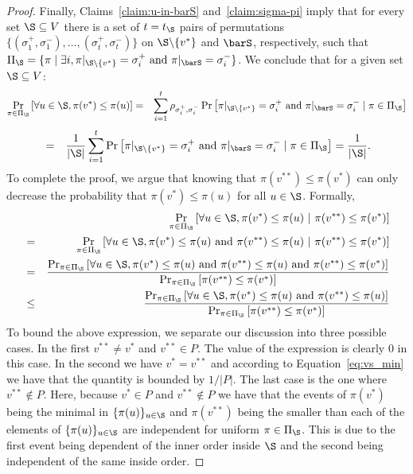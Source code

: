 \begin{proof}
Finally, Claims~\ref{claim:u-in-barS} and~\ref{claim:sigma-pi} imply that for every set $\S\subseteq V$ there is a set of $t=t_{\S}$ pairs of permutations $\{(\sigma_{1}^{+}, \sigma_{1}^{-}),\dots,(\sigma_{t}^{+}, \sigma_{t}^{-}) \}$ on $\S\backslash\{v^*\}$ and $\barS$, respectively, such that $\Pi_{\S}=\{\pi\mid \exists i, \pi|_{\S\backslash\{v^*\}}=\sigma_{i}^{+}\mbox{ and }\pi|_{\barS}=\sigma_{i}^{-}\}$. We conclude that for a given set $\S\subseteq V$:
\vspace{-0.2in}
\begin{eqnarray*}
\Pr_{\pi\in\Pi_{\S}}\left[\forall u\in\S, \pi(v^*)\leq\pi(u)\right] & = & \sum_{i=1}^{t}\rho_{\sigma_{i}^{+},\sigma_{i}^{-}}\Pr\left[\pi|_{\S\backslash\{v^*\}}=\sigma_{i}^{+}\mbox{ and }\pi|_{\barS}=\sigma_{i}^{-}\mid\pi\in\Pi_{\S}\right]
\end{eqnarray*}
\vspace{-0.25in}
\begin{eqnarray} \label{eq:vs_min}
& = & \frac{1}{|\S|}\sum_{i=1}^{t}\Pr\left[\pi|_{\S\backslash\{v^*\}}=\sigma_{i}^{+}\mbox{ and }\pi|_{\barS}=\sigma_{i}^{-}\mid\pi\in\Pi_{\S}\right]=\frac{1}{|\S|}.
\end{eqnarray}
To complete the proof, we argue that knowing that $\pi(v^{**}) \leq \pi(v^*)$ can only decrease the probability that $\pi(v^*)\leq\pi(u)$ for all $u \in \S$. Formally,
\begin{eqnarray*}
 &  & \Pr_{\pi\in\Pi_{\S}}\left[\forall u\in\S,\pi(v^{*})\leq\pi(u)~|~\pi(v^{**})\leq\pi(v^{*})\right]\\
 & = & \Pr_{\pi\in\Pi_{\S}}\left[\forall u\in\S,\pi(v^{*})\leq\pi(u)\mbox{ and }\pi(v^{**})\leq\pi(u)~|~\pi(v^{**})\leq\pi(v^{*})\right]\\
& = & \frac{\Pr_{\pi\in\Pi_{\S}}\left[\forall u\in\S,\pi(v^{*})\leq\pi(u)\mbox{ and }\pi(v^{**})\leq\pi(u) \mbox{ and }    \pi(v^{**})\leq\pi(v^{*})     \right]}{\Pr_{\pi\in\Pi_{\S}}\left[\pi(v^{**})\leq\pi(v^{*})\right]}\\
 & \leq & \frac{\Pr_{\pi\in\Pi_{\S}}\left[\forall u\in\S,\pi(v^{*})\leq\pi(u)\mbox{ and }\pi(v^{**})\leq\pi(u)\right]}{\Pr_{\pi\in\Pi_{\S}}\left[\pi(v^{**})\leq\pi(v^{*})\right]}
\end{eqnarray*}
To bound the above expression, we separate our discussion into three possible cases. In the first $v^{**} \neq v^*$ and $v^{**} \in P$. The value of the expression is clearly 0 in this case. In the second we have $v^* = v^{**}$ and according to Equation~\eqref{eq:vs_min} we have that the quantity is bounded by $1/|P|$. The last case is the one where $v^{**} \notin P$. Here, because $v^* \in P$ and $v^{**} \notin P$ we have that the events of $\pi(v^*)$ being the minimal in $\{\pi(u)\}_{u\in\S}$ and $\pi(v^{**})$ being the smaller than each of the elements of $\{\pi(u)\}_{u\in\S}$ are independent for uniform $\pi \in \Pi_{\S}$. This is due to the first event being dependent of the inner order inside $\S$ and the second being independent of the same inside order.

\end{proof}
